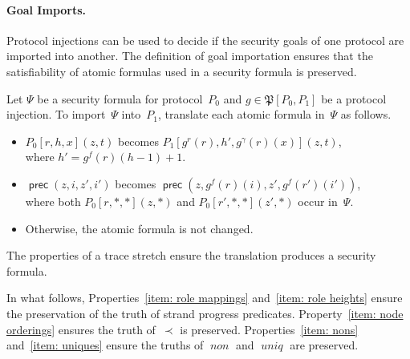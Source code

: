 \documentclass[12pt]{article}
\newcommand{\cn}[1]{\ensuremath{\operatorname{\mathsf{#1}}}}
\newcommand{\fn}[1]{\ensuremath{\operatorname{\mathit{#1}}}}
\newcommand{\alg}[1]{\ensuremath{\mathfrak{#1}}}
\begin{document}
\paragraph{Goal Imports.}
Protocol injections can be used to decide if the security goals of one
protocol are imported into another.  The definition of goal
importation ensures that the satisfiability of atomic formulas used in
a security formula is preserved.

Let $\Psi$ be a security formula for protocol~$P_0$ and
$g\in\alg{P}[P_0,P_1]$ be a protocol injection.  To import~$\Psi$
into~$P_1$, translate each atomic formula in~$\Psi$ as follows.
\begin{itemize}
\item $P_0[r,h,x](z, t)$ becomes
  $P_1[g^r(r),h',g^\gamma(r)(x)](z,t)$,\\ where $h'=g^f(r)(h-1)+1$.
\item $\cn{prec}(z,i,z',i')$ becomes
  $\cn{prec}(z,g^f(r)(i),z',g^f(r')(i'))$,\\ where both
  $P_0[r,\ast,\ast](z,\ast)$ and $P_0[r',\ast,\ast](z',\ast)$ occur
  in~$\Psi$.
\item Otherwise, the atomic formula is not changed.
\end{itemize}
The properties of a trace stretch ensure the translation produces a
security formula.

In what follows, Properties~\ref{item: role mappings} and~\ref{item:
  role heights} ensure the preservation of the truth of strand
progress predicates.  Property~\ref{item: node orderings} ensures the
truth of~$\prec$ is preserved.  Properties~\ref{item: nons}
and~\ref{item: uniques} ensure the truths of \fn{non} and \fn{uniq}
are preserved.
\end{document}
